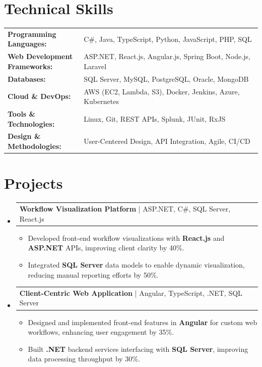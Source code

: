 \documentclass[letterpaper,10pt]{article}
\makeatletter
\newcommand{\resumeItem}[1]{
  \item{\fontsize{8pt}{9pt}\selectfont
    #1 \vspace{-3pt}
  }
}
\newcommand{\resumeProjectHeading}[2]{
    \item
    \begin{tabular*}{1.001\textwidth}{l@{\extracolsep{\fill}}r}
      \fontsize{8.5pt}{10pt}#1 & \textbf{\fontsize{8.5pt}{10pt} #2}\\
    \end{tabular*}\vspace{-7pt}
}
\newcommand{\resumeSubHeadingListStart}{\begin{itemize}[leftmargin=0pt, label={}]}
\newcommand{\resumeSubHeadingListEnd}{\end{itemize}}
\newcommand{\resumeItemListStart}{\begin{itemize}[leftmargin=*]}
\newcommand{\resumeItemListEnd}{\end{itemize}\vspace{-5pt}}
\makeatother
\begin{document}
\section{Technical Skills}
        \vspace{-14pt}
        \begin{table}[h]
            \fontsize{8pt}{9pt}\selectfont
            \begin{tabular}{p{0.3\linewidth} p{0.7\linewidth}}
                \textbf{Programming Languages:} & C\#, Java, TypeScript, Python, JavaScript, PHP, SQL \\
                \textbf{Web Development Frameworks:} & ASP.NET, React.js, Angular.js, Spring Boot, Node.js, Laravel \\
                \textbf{Databases:} & SQL Server, MySQL, PostgreSQL, Oracle, MongoDB \\
                \textbf{Cloud \& DevOps:} & AWS (EC2, Lambda, S3), Docker, Jenkins, Azure, Kubernetes \\
                \textbf{Tools \& Technologies:} & Linux, Git, REST APIs, Splunk, JUnit, RxJS \\
                \textbf{Design \& Methodologies:} & User-Centered Design, API Integration, Agile, CI/CD \\
            \end{tabular}
        \end{table}
 \vspace{-18pt}

\section{Projects}
    \vspace{-5pt}
    \resumeSubHeadingListStart
          \resumeProjectHeading
            {\textbf{Workflow Visualization Platform} | ASP.NET, C\#, SQL Server, React.js}{}
            \resumeItemListStart
                \resumeItem{Developed front-end workflow visualizations with \textbf{React.js} and \textbf{ASP.NET} APIs, improving client clarity by 40\%.}
                \resumeItem{Integrated \textbf{SQL Server} data models to enable dynamic visualization, reducing manual reporting efforts by 50\%.}
            \resumeItemListEnd
        \vspace{-12pt}
    
        \resumeProjectHeading
            {\textbf{Client-Centric Web Application} | Angular, TypeScript, .NET, SQL Server}{}
        \resumeItemListStart
                \resumeItem{Designed and implemented front-end features in \textbf{Angular} for custom web workflows, enhancing user engagement by 35\%.}
                \resumeItem{Built \textbf{.NET} backend services interfacing with \textbf{SQL Server}, improving data processing throughput by 30\%.}
        \resumeItemListEnd
      \vspace{-12pt}
    \resumeSubHeadingListEnd
\end{document}
